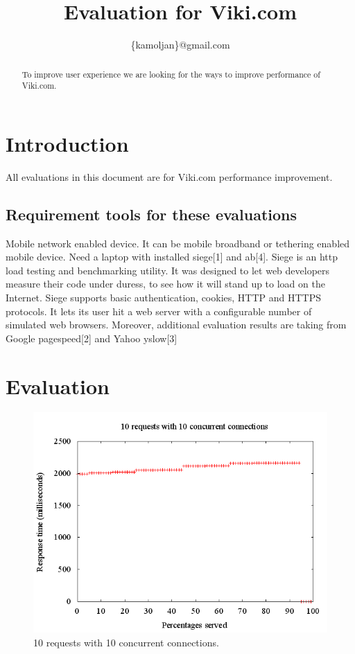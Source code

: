 \documentclass[conference]{./common/IEEEtran}
\begin{document}
\title{Evaluation for Viki.com}
\author{
\{{kamoljan\}@gmail.com}
}

\maketitle

\begin{abstract}
To improve user experience we are looking for the ways to improve performance of Viki.com.
\end{abstract}

\section{Introduction}
All evaluations in this document are for Viki.com performance improvement. 

\subsection{Requirement tools for these evaluations}
Mobile network enabled device. It can be mobile broadband or tethering enabled mobile device.
Need a laptop with installed {siege}[1] and {ab}[4]. Siege is an http load testing and benchmarking utility. 
It was designed to let web developers measure their code under duress, to see how it will stand up to load on the Internet. 
Siege supports basic authentication, cookies, HTTP and HTTPS protocols. 
It lets its user hit a web server with a configurable number of simulated web browsers.
Moreover, additional evaluation results are taking from Google {pagespeed}[2] and Yahoo {yslow}[3]

\section{Evaluation}
\pgfplotsset{}

\begin{figure}[ht]
\begin{minipage}[b]{\linewidth}\centering
\includegraphics[width=\textwidth]{include/gnu/10_10.png}
\end{minipage}
\caption{10 requests with 10 concurrent connections.}
\label{fig:my_read_latency}
\end{figure}
\end{document}
